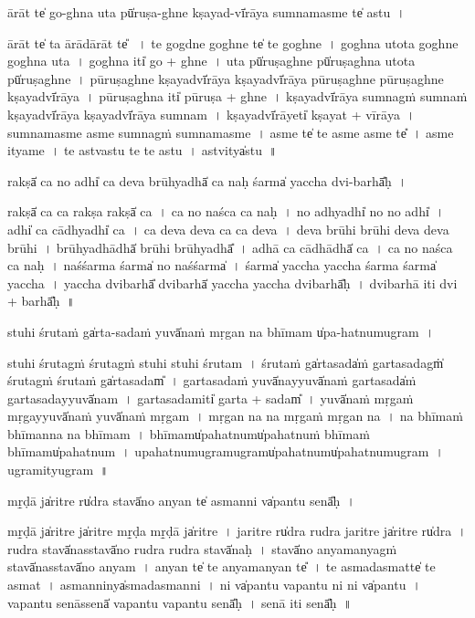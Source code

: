 \documentclass[parskip, DIV=14]{scrartcl}
\begin{document}
{ā॒rāt te̍ go॒-ghna u॒ta pū̍ruṣa॒-ghne kṣa॒yad-vī̍rāya su॒mnama॒sme te̍ astu~।

ā॒rāt te̍ ta ā॒rādā॒rāt te̎ ~।
te॒ go॒gdne go॒ghne te̍ te go॒ghne~।
go॒ghna u॒tota go॒ghne go॒ghna u॒ta~।
go॒ghna iti̍ go + ghne~।
u॒ta pū̍ruṣa॒ghne pū̍ruṣa॒ghna u॒tota pū̍ruṣa॒ghne~।
pū॒ru॒ṣa॒ghne kṣa॒yadvī̍rāya kṣa॒yadvī̍rāya pūruṣa॒ghne pūruṣa॒ghne kṣa॒yadvī̍rāya~।
pū॒ru॒ṣa॒ghna iti̍ pūruṣa + ghne~।
kṣa॒yadvī̍rāya su॒mnagṁ su॒mnaṁ kṣa॒yadvī̍rāya kṣa॒yadvī̍rāya su॒mnam~।
kṣa॒yadvī̍rā॒yeti̍ kṣa॒yat + vī॒rā॒ya॒~।
su॒mnama॒sme a॒sme su॒mnagṁ su॒mna॒masme~।
a॒sme te̍ te a॒sme a॒sme te̎~।
a॒sme itya॒me~।
te॒ a॒stva॒stu॒ te॒ te॒ a॒stu॒~।
a॒stvitya̍stu~॥ 

rakṣā̍ ca no॒ adhi̍ ca deva brū॒hyadhā̍ ca na॒ḥ śarma̍ yaccha dvi॒-barhā̎ḥ~।

rakṣā̍ ca ca॒ rakṣa॒ rakṣā̍ ca~।
ca॒ no॒ na॒śca॒ ca॒ na॒ḥ॒~।
no॒ adhyadhi̍ no no॒ adhi̍~।
adhi̍ ca॒ cādhyadhi̍ ca~।
ca॒ de॒va॒ de॒va॒ ca॒ ca॒ de॒va॒~।
de॒va॒ brū॒hi॒ brū॒hi॒ de॒va॒ de॒va॒ brū॒hi॒~।
brū॒hyadhādhā̍ brūhi brū॒hyadhā̎~।
adhā ca॒ cādhādhā̍ ca~।
ca॒ no॒ na॒śca॒ ca॒ na॒ḥ॒~।
na॒śśarma॒ śarma̍ no na॒śśarma̍~।
śarma̍ yaccha yaccha॒ śarma॒ śarma̍ yaccha~।
ya॒ccha॒ dvi॒barhā̎ dvi॒barhā̍ yaccha yaccha dvi॒barhā̎ḥ~।
dvi॒barhā॒ iti dvi + barhā̎ḥ~॥ 


stu॒hi śru॒taṁ ga̍rta॒-sadaṁ yuvā̍naṁ mṛ॒gan na bhī॒mam u̍pa-ha॒tnumu॒gram~।

stu॒hi śru॒tagṁ śru॒tagṁ stu॒hi stu॒hi śru॒tam~।
śru॒taṁ ga̍rta॒sada̍ṁ garta॒sadagṁ̍ śru॒tagṁ śru॒taṁ ga̍rta॒sadam̎~।
ga॒rta॒sada॒ṁ yuvā̍na॒yyuvā̍naṁ garta॒sada̍ṁ garta॒sada॒yyuvā̍nam~।
ga॒rta॒sada॒miti̍ garta + sadam̎~।
yuvā̍naṁ mṛ॒gaṁ mṛ॒gayyuvā̍naṁ yuvā̍naṁ mṛ॒gam~।
mṛ॒gan na na mṛ॒gaṁ mṛ॒gan na~।
na bhī॒maṁ bhī॒manna na bhī॒mam~।
bhī॒mamu̍paha॒tnumu̍paha॒tnuṁ bhī॒maṁ bhī॒mamu̍paha॒tnum~।
u॒pa॒ha॒tnumu॒gramu॒gramu̍paha॒tnumu̍paha॒tnumu॒gram~।
u॒gramityu॒gram~॥ 


mṛ̱ḍā ja̍ri॒tre ru̍dra॒ stavā̍no a॒nyan te̍ a॒smanni va̍pantu॒ senā̎ḥ~।

mṛ̱ḍā ja̍ri॒tre ja̍ri॒tre mṛ̱ḍa mṛ̱ḍā ja̍ri॒tre~।
ja॒ri॒tre ru̍dra rudra jari॒tre ja̍ri॒tre ru̍dra~।
ru॒dra॒ stavā̍na॒sstavā̍no rudra rudra॒ stavā̍naḥ~।
stavā̍no a॒nyama॒nyagṁ stavā̍na॒sstavā̍no a॒nyam~।
a॒nyan te̍ te a॒nyama॒nyan te̎~।
te॒ a॒smada॒smatte̍ te a॒smat~।
a॒smanninya̍smada॒smanni~।
ni va̍pantu vapantu॒ ni ni va̍pantu~।
va॒pa॒ntu॒ senā॒ssenā̍ vapantu vapantu॒ senā̎ḥ~।
senā॒ iti॒ senā̎ḥ~॥ 

}
\end{document}
